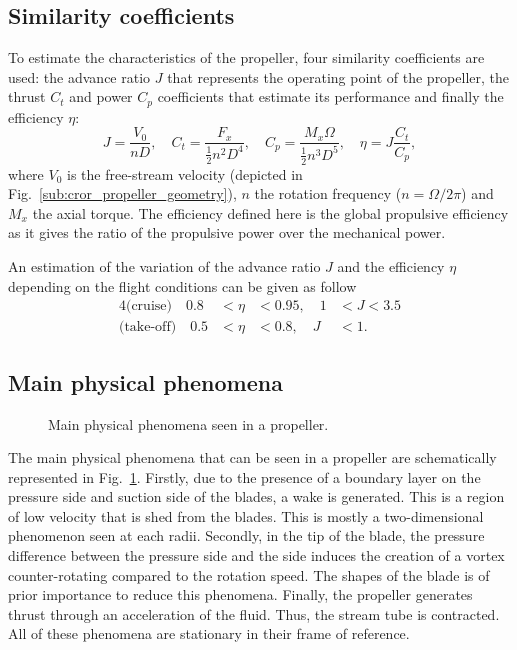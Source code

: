 \subsection{Similarity coefficients}
\label{sub:similarity_coefficients}
To estimate the characteristics of the propeller, four similarity
coefficients are used:
the advance ratio $J$ that represents the operating point of the propeller,
the thrust $C_t$ and power $C_p$ coefficients that estimate its performance and finally
the efficiency $\eta$:
\begin{equation}
    J = \frac{V_0}{n D}, \quad
    C_t = \frac{F_x}{\frac{1}{2} n ^ 2  D ^ 4}, \quad
    C_p = \frac{M_x \Omega}{\frac{1}{2} n ^ 3 D ^ 5}, \quad
    \eta = J \frac{C_t}{C_p},
\end{equation}
where $V_0$ is the free-stream velocity 
(depicted in Fig.~\ref{sub:cror_propeller_geometry}), 
$n$ the rotation frequency ($n = \Omega / 2 \pi$) and
$M_x$ the axial torque.
The efficiency defined here is the global propulsive efficiency
as it gives the ratio of the propulsive power over the mechanical power.

An estimation of the variation of the advance ratio $J$ and the 
efficiency $\eta$ depending on the flight conditions can be given as follow
\begin{alignat}{4}
    \text{(cruise)} \quad  0.8 &< \eta &< 0.95, \quad 1 &< J < 3.5 \\
    \text{(take-off)} \quad  0.5 &< \eta &< 0.8, \quad J &< 1.
\end{alignat}

\subsection{Main physical phenomena}
\label{sub:cror_propeller_physics}

\begin{figure}[htb]
  \centering
  \quad{}
  \quad{}
  \caption{Main physical phenomena seen in a propeller.}
  \label{fig:propeller_phys_phenomena}
\end{figure}
The main physical phenomena that can be seen in a propeller are schematically represented
in Fig.~\ref{fig:propeller_phys_phenomena}. Firstly, due to the presence of a boundary
layer on the pressure side and suction side of the blades, a wake is generated.
This is a region of low velocity that is shed from the blades. This is mostly a two-dimensional
phenomenon seen at each radii. Secondly, in the tip of the blade, the pressure difference between 
the pressure side and the side induces the creation of a vortex counter-rotating compared to 
the rotation speed. The shapes of the blade is of prior importance to reduce this phenomena.
Finally, the propeller generates thrust through an acceleration of the fluid. Thus, the stream
tube is contracted. All of these phenomena are stationary in their frame of reference.


